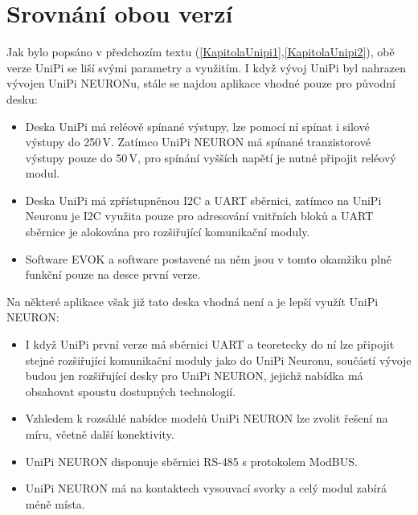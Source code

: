 

 
 



\section{Srovnání obou verzí}

Jak bylo popsáno v předchozím textu (\ref{KapitolaUnipi1},\ref{KapitolaUnipi2}), obě verze UniPi se liší svými parametry a využitím. I když vývoj UniPi byl nahrazen vývojen UniPi NEURONu, stále se najdou aplikace vhodné pouze pro původní desku:


\begin{itemize}
	\item Deska UniPi má reléově spínané výstupy, lze pomocí ní spínat i silové výstupy do 250\,V. Zatímco UniPi NEURON má spínané tranzistorové výstupy pouze do 50\,V, pro spínání vyšších napětí je nutné připojit reléový modul.
	\item Deska UniPi má zpřístupněnou I2C a UART sběrnici, zatímco na UniPi Neuronu je I2C využita pouze pro adresování vnitřních bloků a UART sběrnice je alokována pro rozšiřující komunikační moduly.
	\item Software EVOK a software postavené na něm jsou v tomto okamžiku plně funkční pouze na desce první verze.	
\end{itemize}

Na některé aplikace však již tato deska vhodná není a je lepší využít UniPi NEURON:

\begin{itemize}
	\item I když UniPi první verze má sběrnici UART a teoretecky do ní lze připojit stejné rozšiřující komunikační moduly jako do UniPi Neuronu, součástí vývoje budou jen rozšiřující desky pro UniPi NEURON, jejichž nabídka má obsahovat spoustu dostupných technologií.
	\item Vzhledem k rozsáhlé nabídce modelů UniPi NEURON lze zvolit řešení na míru, včetně další konektivity.
	\item UniPi NEURON disponuje sběrnici RS-485 s protokolem ModBUS.
	\item UniPi NEURON má na kontaktech vysouvací svorky a celý modul zabírá méně místa.	
\end{itemize}

